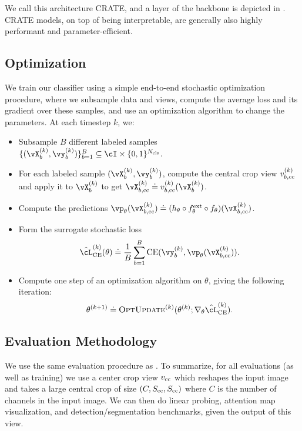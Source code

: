 \documentclass[../../book-main.tex]{subfiles}
\begin{document}
We call this architecture CRATE, and a layer of the backbone is depicted in . CRATE models, on top of being interpretable, are generally also highly performant and parameter-efficient. 

\subsection{Optimization} \label{sub:image_classification_optimization}

We train our classifier using a simple end-to-end stochastic optimization procedure, where we subsample data and views, compute the average loss and its gradient over these samples, and use an optimization algorithm to change the parameters. At each timestep \(k\), we:
\begin{itemize}
    \item Subsample \(B\) different labeled samples \(\{(\vX_{b}^{(k)}, \vy_{b}^{(k)})\}_{b = 1}^{B} \subseteq \cI \times \{0, 1\}^{N_{\cls}}\).
    \item For each labeled sample \((\vX_{b}^{(k)}, \vy_{b}^{(k)})\), compute the central crop view \(v_{b, \mathrm{cc}}^{(k)}\) and apply it to \(\vX_{b}^{(k)}\) to get \(\vX_{b, \cc}^{(k)} \doteq v_{b, \cc}^{(k)}(\vX_{b}^{(k)})\).
    \item Compute the predictions \(\vp_{\theta}(\vX_{b, \cc}^{(k)}) \doteq (h_{\theta} \circ f_{\theta}^{\ext} \circ f_{\theta})(\vX_{b, \cc}^{(k)})\).
    \item Form the surrogate stochastic loss 
    \begin{equation}
        \hat{\cL}_{\CE}^{(k)}(\theta) \doteq \frac{1}{B}\sum_{b = 1}^{B}\CE(\vy_{b}^{(k)}, \vp_{\theta}(\vX_{b, \cc}^{(k)})).
    \end{equation}
    \item Compute one step of an optimization algorithm on \(\theta\), giving the following iteration:
    \begin{equation}
        \theta^{(k + 1)} \doteq \textsc{OptUpdate}^{(k)}(\theta^{(k)}; \nabla_{\theta}\hat{\cL}_{\CE}^{(k)}).
    \end{equation}
\end{itemize}


\subsection{Evaluation Methodology} \label{sub:image_classification_evals}

We use the same evaluation procedure as . To summarize, for all evaluations (as well as training) we use a center crop view \(v_{\mathrm{cc}}\) which reshapes the input image and takes a large central crop of size \((C, S_{\mathrm{cc}}, S_{\mathrm{cc}})\) where \(C\) is the number of channels in the input image. We can then do linear probing, attention map visualization, and detection/segmentation benchmarks, given the output of this view.
\end{document}
